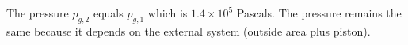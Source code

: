 The pressure \( p_{g,2} \) equals \( p_{g,1} \) which is \( 1.4 \times 10^5 \) Pascals. The pressure remains the same because it depends on the external system (outside area plus piston).